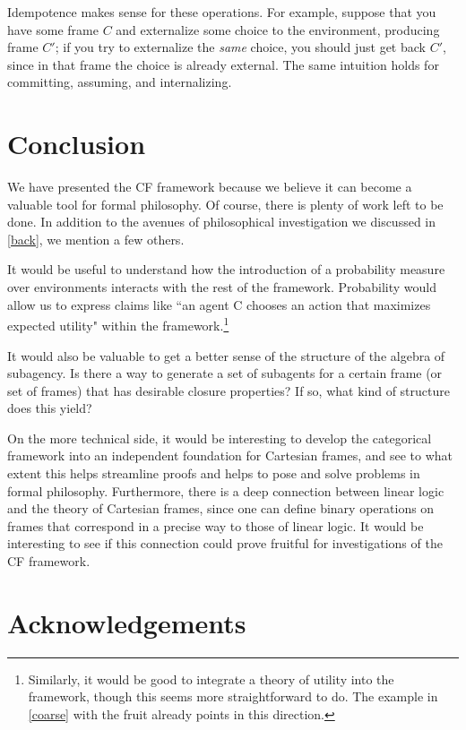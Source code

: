 \documentclass{article}
\begin{document}
\noindent Idempotence makes sense for these operations. For example, suppose that you have some frame $C$ and externalize some choice to the environment, producing frame $C'$; if you try to externalize the \textit{same} choice, you should just get back $C'$, since in that frame the choice is already external. The same intuition holds for committing, assuming, and internalizing. 

\section{Conclusion}

We have presented the CF framework because we believe it can become a valuable tool for formal philosophy.
Of course, there is plenty of work left to be done. In addition to the avenues of philosophical investigation we discussed in \cref{back}, we mention a few others.

It would be useful to understand how the introduction of a probability measure over environments interacts with the rest of the framework. Probability would allow us to express claims like ``an agent C chooses an action that maximizes expected utility" within the framework.\footnote{Similarly, it would be good to integrate a theory of utility into the framework, though this seems more straightforward to do. The example in \cref{coarse} with the fruit already points in this direction.}  

It would also be valuable to get a better sense of the structure of the algebra of subagency. Is there a way to generate a set of subagents for a certain frame (or set of frames) that has desirable closure properties? If so, what kind of structure does this yield? 

On the more technical side, it would be interesting to develop the categorical framework into an independent foundation for Cartesian frames, and see to what extent this helps streamline proofs and helps to pose and solve problems in formal philosophy. Furthermore, there is a deep connection between linear logic and the theory of Cartesian frames, since one can define binary operations on frames that correspond in a precise way to those of linear logic. It would be interesting to see if this connection could prove fruitful for investigations of the CF framework.

\section*{Acknowledgements}
\end{document}
